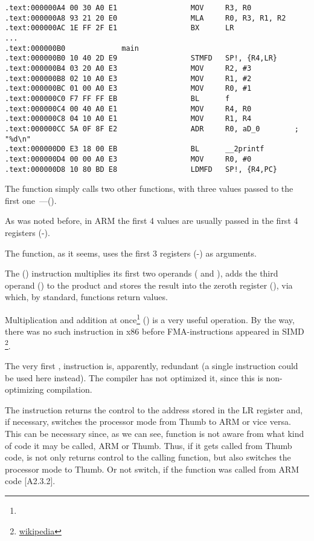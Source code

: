 \subsectionold{\NonOptimizingKeilVI (\ARMMode)}

\begin{lstlisting}
.text:000000A4 00 30 A0 E1                 MOV     R3, R0
.text:000000A8 93 21 20 E0                 MLA     R0, R3, R1, R2
.text:000000AC 1E FF 2F E1                 BX      LR
...
.text:000000B0             main
.text:000000B0 10 40 2D E9                 STMFD   SP!, {R4,LR}
.text:000000B4 03 20 A0 E3                 MOV     R2, #3
.text:000000B8 02 10 A0 E3                 MOV     R1, #2
.text:000000BC 01 00 A0 E3                 MOV     R0, #1
.text:000000C0 F7 FF FF EB                 BL      f
.text:000000C4 00 40 A0 E1                 MOV     R4, R0
.text:000000C8 04 10 A0 E1                 MOV     R1, R4
.text:000000CC 5A 0F 8F E2                 ADR     R0, aD_0        ; "%d\n"
.text:000000D0 E3 18 00 EB                 BL      __2printf
.text:000000D4 00 00 A0 E3                 MOV     R0, #0
.text:000000D8 10 80 BD E8                 LDMFD   SP!, {R4,PC}
\end{lstlisting}

The \main function simply calls two other functions, with three values passed to the 
first one~---(\ttf).

As was noted before, in ARM the first 4 values are usually passed in the first 4 registers (-).

The \ttf function, as it seems, uses the first 3 registers (-) as arguments.

The  () 
instruction multiplies its first two operands ( and ), adds the third operand () to the product and stores
the result into the zeroth register (), via which, by standard, functions return values.

Multiplication and addition at once\footnote{\WPMAO} () 
is a very useful operation. By the way, there was no such instruction in x86 
before FMA-instructions appeared in SIMD
\footnote{\href{http://go.yurichev.com/17103}{wikipedia}}.

The very first , 
instruction is, apparently, redundant (a single  instruction could be used here instead). 
The compiler has not optimized it, since this is non-optimizing compilation.


The  instruction returns the control to the address stored in the \ac{LR} register and, if necessary, 
switches the processor mode from Thumb to ARM or vice versa.
This can be necessary since, as we can see, function \ttf is not aware from what kind of code it may be
called, ARM or Thumb.
Thus, if it gets called from Thumb code, 
 is not only returns control to the calling function,
but also switches the processor mode to Thumb.
Or not switch, if the function was called from ARM code [\ARMSevenRef A2.3.2].
